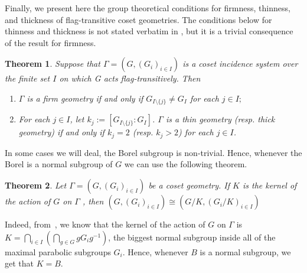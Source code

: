 \documentclass[11pt,letterpaper]{amsart}
\newtheorem{theorem}{Theorem}[section]
\begin{document}
Finally, we present here the group theoretical conditions for firmness, thinness, and thickness of flag-transitive coset geometries. The conditions below for thinness and thickness is not stated verbatim in \cite{buekenhout2013diagram}, but it is a trivial consequence of the result for firmness.

\begin{theorem}\label{thm:CosetFIRM}\cite[Corollary 1.8.15 (adapted)]{buekenhout2013diagram}
     Suppose that $\Gamma = (G,(G_i)_{i\in I})$ is a coset incidence system over
the finite set $I$ on which G acts flag-transitively. Then 
\begin{enumerate}
    \item $\Gamma$ is a firm geometry if and only if
    $G_{I\setminus \{j\} } \neq G_I$ for each $j \in I;$
    \item For each $j\in I$, let  $k_j := [G_{I\setminus \{j\} } : G_I]$. $\Gamma$ is a thin geometry (resp. thick geometry) if and only if $k_j=2$ (resp. $k_j>2$) for each $j\in I$.

\end{enumerate}
\end{theorem}

In some cases we will deal, the Borel subgroup is non-trivial. Hence, whenever the Borel is a normal subgroup of $G$ we can use the following theorem.

\begin{theorem}\cite{Tits1957}\label{thm:CGQuotient}
    Let $\Gamma=(G,(G_i)_{i\in I})$ be a coset geometry. If $K$ is the kernel of the action of $G$ on $\Gamma$
, then $(G,(G_i)_{i\in I}) \cong (G/K,(G_i/K)_{i\in I})$
\end{theorem}

Indeed, from~\cite{Tits1957}, we know that the kernel of the action of $G$ on $\Gamma$ is $K = \bigcap_{i\in I} (\bigcap_{g\in G} gG_ig^{-1})$, the biggest normal subgroup inside all of the maximal parabolic subgroups $G_i$. Hence, whenever $B$ is a normal subgroup, we get that $K = B$.
\end{document}
